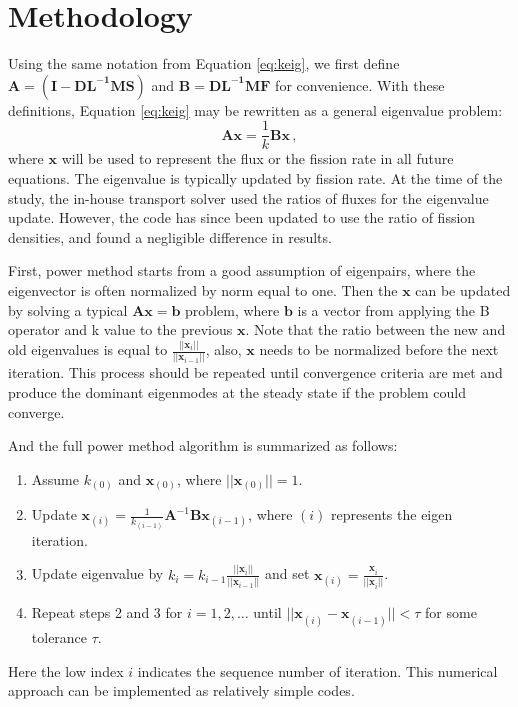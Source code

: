 \section{Methodology}
Using the same notation from Equation \ref{eq:keig}, we first define $\mathbf{A} =  \mathbf{(I - DL^{-1}MS)}$ and $\mathbf{B} = \mathbf{DL^{-1}MF}$ for convenience.
With these definitions, Equation \ref{eq:keig} may be rewritten as a general eigenvalue problem:
\begin{equation}
\mathbf{A} \mathbf{x} = \frac{1}{k} \mathbf{B} \mathbf{x} \, ,
\label{eq:eigenvalue}
\end{equation}
where $\mathbf{x}$ will be used to represent the flux or the fission rate in all future equations.
The eigenvalue is typically updated by fission rate.
At the time of the study, the in-house transport solver used the ratios of fluxes for the eigenvalue update.
However, the code has since been updated to use the ratio of fission densities, and found a negligible difference in results.

First, power method starts from a good assumption of eigenpairs, where the eigenvector is often normalized by norm equal to one.
Then the $\mathbf{x}$ can be updated by solving a typical $\mathbf{A} \mathbf{x} =\mathbf{b}$ problem, where $\mathbf{b}$ is a vector from applying the B operator and k value to the previous $\mathbf{x}$.
Note that the ratio between the new and old eigenvalues is equal to $\frac{||\mathbf{x}_{i}||}{||\mathbf{x}_{i-1}||}$, also, $\mathbf{x}$ needs to be normalized before the next iteration. 
This process should be repeated until convergence criteria are met and produce the dominant eigenmodes at the steady state if the problem could converge.

And the full power method algorithm is summarized as follows:
\begin{enumerate}
  \item Assume $k_{(0)}$ and $\mathbf{x}_{(0)}$, where $||\mathbf{x}_{(0)}||=1$.
  \item Update $\mathbf{x}_{(i)} = \frac{1}{k_{(i-1)}} \mathbf{A}^{-1} \mathbf{B} \mathbf{x}_{(i-1)}$, where $(i)$ represents the eigen iteration.
  \item Update eigenvalue by  $k_{i} = k_{i-1} \frac{||\mathbf{x}_{i}||}{||\mathbf{x}_{i-1}||}$ and set  $\mathbf{x}_{(i)} =\frac{\mathbf{x}^{}_{i}}{||\mathbf{x}^{}_{i}||}$.
  \item Repeat steps 2 and 3 for $i = 1, 2, \ldots$ until $||\mathbf{x}^{}_{(i)} - \mathbf{x}^{}_{(i-1)}|| < \tau$ for some tolerance $\tau$.
\end{enumerate}
Here the low index $i$ indicates the sequence number of iteration.
This numerical approach can be implemented as relatively simple codes.

